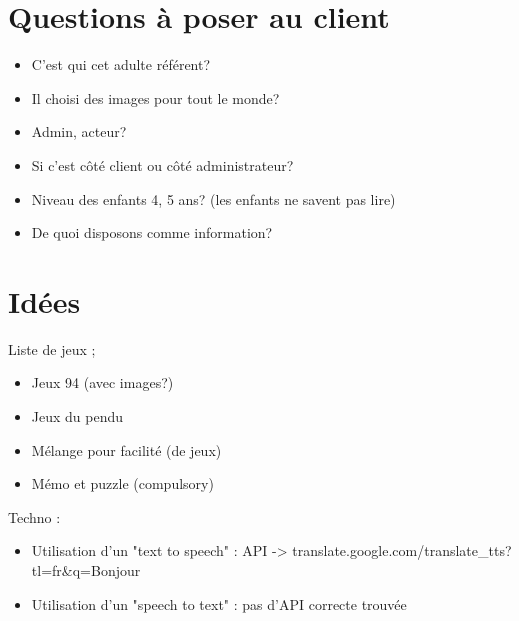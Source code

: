 \documentclass[12pt,a4paper]{report}
\begin{document}
\chapter{Questions à poser au client}

\begin{itemize}
\item C'est qui cet adulte référent? 
\item Il choisi des images pour tout le monde?
\item Admin, acteur? 
\item Si c'est côté client ou côté administrateur? 
\item Niveau des enfants 4, 5 ans? (les enfants ne savent pas lire)
\item De quoi disposons comme information?
\end{itemize}

\chapter{Idées}

Liste de jeux ;
\begin{itemize}
\item Jeux 94 (avec images?)
\item Jeux du pendu
\item Mélange pour facilité (de jeux)
\item Mémo et puzzle (compulsory)
\end{itemize}

Techno :
\begin{itemize}
\item Utilisation d'un "text to speech" : API -> translate.google.com/translate_tts?tl=fr&q=Bonjour
\item Utilisation d'un "speech to text" : pas d'API correcte trouvée
\end{itemize}





\end{document}
